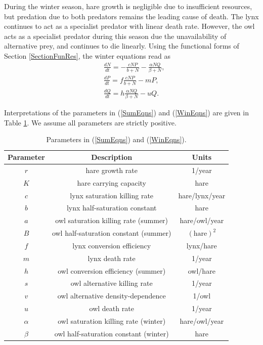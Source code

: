 \documentclass[12pt]{UOthesis}
\theoremstyle{remarkstyle}
\begin{document}
During the winter season, hare growth is negligible due to insufficient resources, but predation due to both predators remains the leading cause of death. The lynx continues to act as a specialist predator with linear death rate. However, the owl acts as a specialist predator during this season due the unavailability of alternative prey, and continues to die linearly. Using the functional forms of Section \ref{SectionFunRes}, the winter equations read as
\begin{equation}
\begin{split}
&\frac{dN}{dt}=-\frac{cNP}{b+N}-\frac{\alpha NQ}{\beta+N},\\
&\frac{dP}{dt}=f\frac{cNP}{b+N}-mP,\\
&\frac{dQ}{dt}=h\frac{\alpha NQ}{\beta+N}-uQ.
\end{split}
\label{WinEqns}
\end{equation}

Interpretations of the parameters in (\ref{SumEqns}) and (\ref{WinEqns}) are given in Table \ref{TableHLOParameters}. We assume all parameters are strictly positive.\\

\begin{table}[h!]
	\centering
	\begin{tabular}{c | c | c}
		Parameter & Description & Units\\
		\hline
		$r$ & hare growth rate & 1/year\\
		$K$ & hare carrying capacity & hare\\
		$c$ & lynx saturation killing rate & hare/lynx/year\\
		$b$ & lynx half-saturation constant & hare\\
		$a$ & owl saturation killing rate (summer)  & hare/owl/year\\
		$B$ & owl half-saturation constant (summer) & $(\text{hare})^2$\\
		$f$ & lynx conversion efficiency & lynx/hare\\
		$m$ & lynx death rate & 1/year\\
		$h$ & owl conversion efficiency (summer)& owl/hare\\
		$s$ & owl alternative killing rate & 1/year\\
		$v$ & owl alternative density-dependence & 1/owl\\
		$u$ & owl death rate & 1/year\\
		$\alpha$ & owl saturation killing rate (winter) & hare/owl/year\\
		$\beta$ & owl half-saturation constant (winter) & hare
	\end{tabular}
\caption[Parameters in the seasonal model]{Parameters in (\ref{SumEqns}) and (\ref{WinEqns}).\label{TableHLOParameters}}
\end{table}
\end{document}

